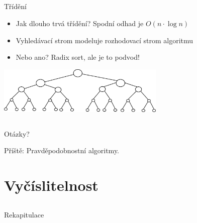 \documentclass{beamer}
\begin{document}
\subsection{}
\begin{frame}{Třídění}
\begin{itemize}
\item Jak dlouho trvá třídění? Spodní odhad je $O(n\cdot\log n)$
\item Vyhledávací strom modeluje rozhodovací strom algoritmu
\item Nebo ano? Radix sort, ale je to podvod!
\end{itemize}
\begin{center}
\includegraphics[width=8cm]{fullbintree.png}
\end{center}
\end{frame}

\subsection{}
\begin{frame}{Otázky?}
\begin{center}
Příště: Pravděpodobnostní algoritmy.
\end{center}
\end{frame}

\section{Vyčíslitelnost}

\subsection{}
\begin{frame}{Rekapitulace}
\end{frame}
\end{document}

